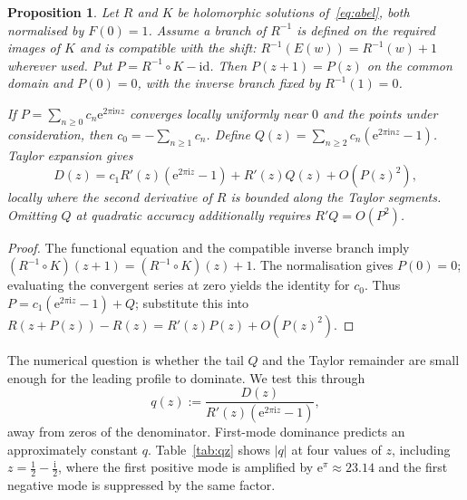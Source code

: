 \documentclass[11pt,a4paper]{article}
\newtheorem{proposition}[theorem]{Proposition}
\theoremstyle{definition}
\newcommand{\Rr}{R}
\newcommand{\Kk}{K}
\newcommand{\eee}{\mathrm{e}}
\newcommand{\ii}{\mathrm{i}}
\begin{document}
\begin{proposition}\label{prop:firstmode}
Let $\Rr$ and $\Kk$ be holomorphic solutions of~\eqref{eq:abel}, both
normalised by $F(0)=1$.  Assume a branch of $\Rr^{-1}$ is defined on the
required images of $\Kk$ and is compatible with the shift:
$\Rr^{-1}(E(w))=\Rr^{-1}(w)+1$ wherever used.  Put
$P=\Rr^{-1}\circ\Kk-\mathrm{id}$.  Then $P(z+1)=P(z)$ on the common
domain and $P(0)=0$, with the inverse branch fixed by $\Rr^{-1}(1)=0$.

If $P=\sum_{n\ge0}c_n\eee^{2\pi\ii nz}$ converges locally uniformly
near $0$ and the points under consideration, then
$c_0=-\sum_{n\ge1}c_n$.  Define
$Q(z)=\sum_{n\ge2}c_n(\eee^{2\pi\ii nz}-1)$.  Taylor expansion gives
\begin{equation}\label{eq:firstmode}
 D(z)=c_1\Rr'(z)(\eee^{2\pi\ii z}-1)+\Rr'(z)Q(z)+O(P(z)^2),
\end{equation}
locally where the second derivative of $\Rr$ is bounded along the Taylor
segments.  Omitting $Q$ at quadratic accuracy additionally requires
$\Rr'Q=O(P^2)$.
\end{proposition}

\begin{proof}
The functional equation and the compatible inverse branch imply
$(\Rr^{-1}\circ\Kk)(z+1)=(\Rr^{-1}\circ\Kk)(z)+1$.
The normalisation gives $P(0)=0$; evaluating the convergent series at zero
yields the identity for $c_0$.  Thus
$P=c_1(\eee^{2\pi\ii z}-1)+Q$; substitute this into
$\Rr(z+P(z))-\Rr(z)=\Rr'(z)P(z)+O(P(z)^2)$.
\end{proof}

The numerical question is whether the tail $Q$ and the Taylor remainder
are small enough for the leading profile to dominate.  We test this through
\begin{equation}\label{eq:q}
 q(z):=\frac{D(z)}{\Rr'(z)(\eee^{2\pi\ii z}-1)},
\end{equation}
away from zeros of the denominator.  First-mode dominance predicts an
approximately constant $q$.  Table~\ref{tab:qz} shows $|q|$ at four values
of $z$, including $z=\tfrac12-\tfrac{\ii}{2}$, where the first positive
mode is amplified by $\eee^\pi\approx23.14$ and the first negative mode
is suppressed by the same factor.
\end{document}
